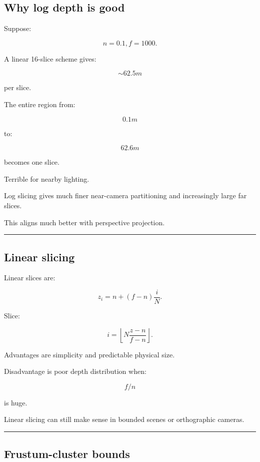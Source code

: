 \subsection{Why log depth is good}\label{04-visual-computing-ii-ch040-why-log-depth-is-good}

Suppose:

\[
n=0.1,
f=1000.
\]

A linear 16-slice scheme gives:

\[
\sim62.5m
\]

per slice.

The entire region from:

\[
0.1m
\]

to:

\[
62.6m
\]

becomes one slice.

Terrible for nearby lighting.

Log slicing gives much finer near-camera partitioning and increasingly large far slices.

This aligns much better with perspective projection.

\begin{center}\rule{0.5\linewidth}{0.5pt}\end{center}

\subsection{Linear slicing}\label{04-visual-computing-ii-ch040-linear-slicing}

Linear slices are:

\[
\boxed{
z_i=
n+
(f-n)\frac iN.
}
\]

Slice:

\[
\boxed{
i=
\left\lfloor
N
\frac{z-n}{f-n}
\right\rfloor.
}
\]

Advantages are simplicity and predictable physical size.

Disadvantage is poor depth distribution when:

\[
f/n
\]

is huge.

Linear slicing can still make sense in bounded scenes or orthographic cameras.

\begin{center}\rule{0.5\linewidth}{0.5pt}\end{center}

\subsection{Frustum-cluster bounds}\label{04-visual-computing-ii-ch040-frustum-cluster-bounds}

